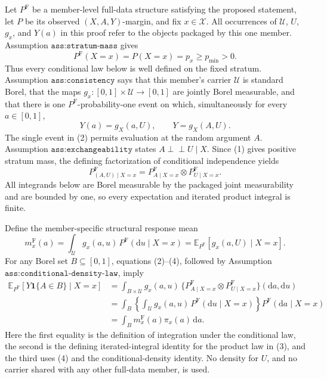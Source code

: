 Let \(P^{\mathrm F}\) be a member-level full-data structure satisfying the proposed statement, let \(P\) be its observed \((X,A,Y)\)-margin, and fix \(x\in\mathcal X\). All occurrences of \(\mathcal U\), \(U\), \(g_x\), and \(Y(a)\) in this proof refer to the objects packaged by this one member. Assumption \(\texttt{ass:stratum-mass}\) gives
\[
 P^{\mathrm F}(X=x)=P(X=x)=p_x\geq p_{\min}>0.
\tag{1}
\]
Thus every conditional law below is well defined on the fixed stratum. Assumption \(\texttt{ass:consistency}\) says that this member's carrier \(\mathcal U\) is standard Borel, that the maps \(g_x:[0,1]\times\mathcal U\to[0,1]\) are jointly Borel measurable, and that there is one \(P^{\mathrm F}\)-probability-one event on which, simultaneously for every \(a\in[0,1]\),
\[
 Y(a)=g_X(a,U),
 \qquad
 Y=g_X(A,U).
\tag{2}
\]
The single event in (2) permits evaluation at the random argument \(A\). Assumption \(\texttt{ass:exchangeability}\) states \(A\perp\!\!\!\perp U\mid X\). Since (1) gives positive stratum mass, the defining factorization of conditional independence yields
\[
 P^{\mathrm F}_{(A,U)\mid X=x}
 =P^{\mathrm F}_{A\mid X=x}\otimes P^{\mathrm F}_{U\mid X=x}.
\tag{3}
\]
All integrands below are Borel measurable by the packaged joint measurability and are bounded by one, so every expectation and iterated product integral is finite.

Define the member-specific structural response mean
\[
 m_x^{\mathrm F}(a)
 =\int_{\mathcal U}g_x(a,u)\,P^{\mathrm F}(\mathrm du\mid X=x)
 =\mathbb E_{P^{\mathrm F}}[g_x(a,U)\mid X=x].
\tag{4}
\]
For any Borel set \(B\subseteq[0,1]\), equations (2)--(4), followed by Assumption \(\texttt{ass:conditional-density-law}\), imply
\[
\begin{aligned}
 \mathbb E_{P^{\mathrm F}}[Y\mathbf 1\{A\in B\}\mid X=x]
 &=\int_{B\times\mathcal U}g_x(a,u)\,
   \{P^{\mathrm F}_{A\mid X=x}\otimes P^{\mathrm F}_{U\mid X=x}\}
   (\mathrm da,\mathrm du)\\
 &=\int_B\left\{\int_{\mathcal U}g_x(a,u)\,
   P^{\mathrm F}(\mathrm du\mid X=x)\right\}
   P^{\mathrm F}(\mathrm da\mid X=x)\\
 &=\int_Bm_x^{\mathrm F}(a)\pi_x(a)\,\mathrm da.
\end{aligned}
\tag{5}
\]
Here the first equality is the definition of integration under the conditional law, the second is the defining iterated-integral identity for the product law in (3), and the third uses (4) and the conditional-density identity. No density for \(U\), and no carrier shared with any other full-data member, is used.

